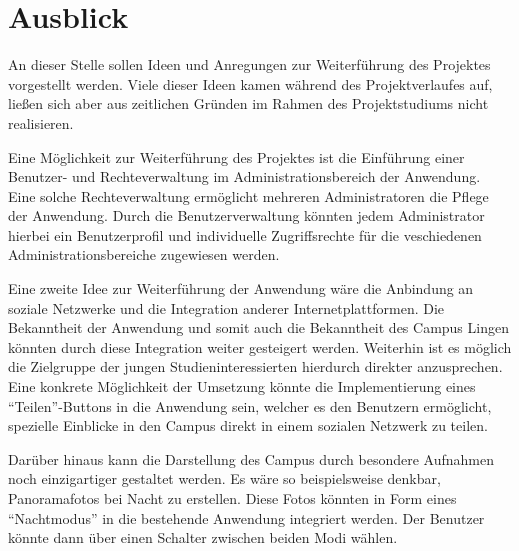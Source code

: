 \section{Ausblick}
\label{sec:Ausblick}

An dieser Stelle sollen Ideen und Anregungen zur Weiterführung des Projektes
vorgestellt werden. Viele dieser Ideen kamen während des Projektverlaufes auf,
ließen sich aber aus zeitlichen Gründen im Rahmen des Projektstudiums nicht
realisieren.

Eine Möglichkeit zur Weiterführung des Projektes ist die Einführung einer
Benutzer- und Rechteverwaltung im Administrationsbereich der Anwendung.
Eine solche Rechteverwaltung ermöglicht mehreren Administratoren die Pflege der
Anwendung. Durch die Benutzerverwaltung könnten jedem Administrator hierbei ein
Benutzerprofil und individuelle Zugriffsrechte für die veschiedenen
Administrationsbereiche zugewiesen werden.

Eine zweite Idee zur Weiterführung der Anwendung wäre die Anbindung an soziale
Netzwerke und die Integration anderer Internetplattformen. Die Bekanntheit der
Anwendung und somit auch die Bekanntheit des Campus Lingen könnten durch diese
Integration weiter gesteigert werden. Weiterhin ist es möglich die Zielgruppe
der jungen Studieninteressierten hierdurch direkter anzusprechen. Eine konkrete
Möglichkeit der Umsetzung könnte die Implementierung eines "`Teilen"'-Buttons
in die Anwendung sein, welcher es den Benutzern ermöglicht, spezielle Einblicke
in den Campus direkt in einem sozialen Netzwerk zu teilen.

Darüber hinaus kann die Darstellung des Campus durch besondere Aufnahmen noch
einzigartiger gestaltet werden. Es wäre so beispielsweise denkbar, Panoramafotos
bei Nacht zu erstellen. Diese Fotos könnten in Form eines "`Nachtmodus"' in die
bestehende Anwendung integriert werden. Der Benutzer könnte dann über einen
Schalter zwischen beiden Modi wählen.
